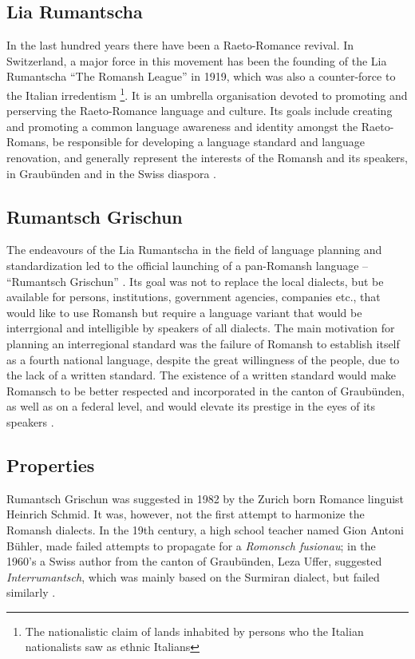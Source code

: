 \subsection{Lia Rumantscha}
In the last hundred years there have been a Raeto-Romance revival. 
In Switzerland, a major force in this movement has been the founding of the Lia Rumantscha \enquote{The Romansh League} in 1919, which was also a counter-force to the Italian irredentism \footnote{The nationalistic claim of lands inhabited by persons who the Italian nationalists saw as ethnic Italians}. 
It is an umbrella organisation devoted to promoting and perserving the Raeto-Romance language and culture. Its goals include creating and promoting a common language awareness and identity amongst the Raeto-Romans, be responsible for developing a language standard and language renovation, and generally represent the interests of the Romansh and its speakers, in Graubünden and in the Swiss diaspora \autocite{dazzi2012}.

\subsection{Rumantsch Grischun}
The endeavours of the Lia Rumantscha in the field of language planning and standardization led to the official launching of a pan-Romansh language -- \enquote{Rumantsch Grischun} \autocite[5]{haiman1992}. 
Its goal was not to replace the local dialects, but be available for persons, institutions, government agencies, companies etc., that would like to use Romansh but require a language variant that would be interrgional and intelligible by speakers of all dialects. The main motivation for planning an interregional standard was the failure of Romansh to establish itself as a fourth national language, despite the great willingness of the people, due to the lack of a written standard. 
The existence of a written standard would make Romansch to be better respected and incorporated in the canton of Graubünden, as well as on a federal level, and would elevate its prestige in the eyes of its speakers \autocite{schmid1982}.

\subsection{Properties}
Rumantsch Grischun was suggested in 1982 by the Zurich born Romance linguist Heinrich Schmid. 
It was, however, not the first attempt to harmonize the Romansh dialects. 
In the 19th century, a high school teacher named Gion Antoni Bühler, made failed attempts to propagate for a \emph{Romonsch fusionau}; in the 1960's a Swiss author from the canton of Graubünden, Leza Uffer, suggested \emph{Interrumantsch}, which was mainly based on the Surmiran dialect, but failed similarly \cite[39]{liver1999}.

